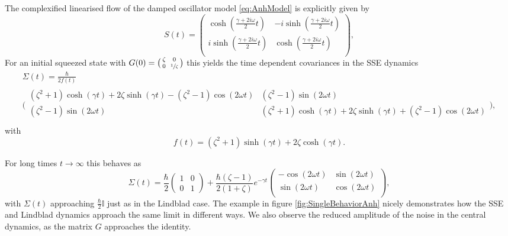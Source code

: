 \documentclass[12pt]{iopart} %
\begin{document}
The complexified linearised flow of the damped oscillator model \cref{eq:AnhModel} is explicitly given by
\begin{equation} \label{eq:SAnh}
    S(t)=\begin{pmatrix}
    \cosh \left(\frac{\gamma +2 i  \omega}{2 }t \right) & -i \sinh \left(\frac{\gamma +2 i  \omega}{2 }t \right) \\
 i \sinh \left(\frac{\gamma +2 i  \omega}{2}t \right) & \cosh \left(\frac{\gamma +2 i  \omega}{2}t \right) \\
    \end{pmatrix},
\end{equation}
For an initial squeezed state with $G(0)=\big(\begin{smallmatrix}\zeta&&0\\0&&\sfrac{1}{\zeta}\end{smallmatrix} \big)$ 
this yields the time dependent covariances in the SSE dynamics
\begin{multline}
    \Sigma(t)=\frac{\hbar}{2 f(t)}\\
\bigg(\begin{smallmatrix}
 (\zeta ^2+1) \cosh (\gamma  t)+2 \zeta  \sinh (\gamma  t)-(\zeta ^2-1) \cos (2  \omega t
   ) & (\zeta ^2-1) \sin (2 
   \omega t) \\
 (\zeta ^2-1) \sin (2  \omega t) &
   (\zeta ^2+1) \cosh (\gamma  t)+2 \zeta  \sinh (\gamma  t)+(\zeta ^2-1) \cos (2 \omega t
   ) \\
\end{smallmatrix}\bigg),
\end{multline}
with 
\begin{equation}
    f(t)=\left(\zeta ^2+1\right) \sinh (\gamma  t)+2 \zeta  \cosh (\gamma  t).
\end{equation}

For long times $t\to\infty$ this behaves as 
\begin{equation}
    \Sigma(t)=\frac{\hbar}{2}\begin{pmatrix}1&0\\0&1\end{pmatrix}+\frac{\hbar (\zeta -1)}{2(1+\zeta)} e^{-\gamma t}\begin{pmatrix}
 - \cos (2 \omega t) & \sin (2 \omega t) \\
  \sin (2  \omega t) & \cos (2 \omega t) \\
\end{pmatrix},
\end{equation}
with $\Sigma(t)$ approaching $\frac{\hbar}{2}\mathbb{I}$ just as in the Lindblad case. The example in figure \ref{fig:SingleBehaviorAnh} nicely demonstrates how the SSE and Lindblad dynamics approach the same limit in different ways. We also observe the reduced amplitude of the noise in the central dynamics, as the matrix $G$ approaches the identity.   
\end{document}
